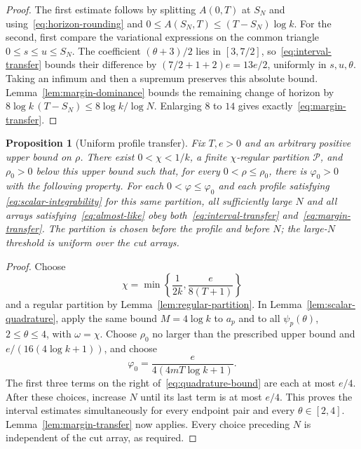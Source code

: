 \documentclass[11pt]{article}
\numberwithin{equation}{section}
\newtheorem{proposition}[theorem]{Proposition}
\theoremstyle{definition}
\theoremstyle{remark}
\newcommand{\1}{\mathbf 1}
\begin{document}
\begin{proof}
The first estimate follows by splitting $A(0,T)$ at $S_N$ and
using~\eqref{eq:horizon-rounding} and
$0\le A(S_N,T)\le(T-S_N)\log k$. For the second, first compare
the variational expressions on the common triangle
$0\le s\le u\le S_N$. The coefficient $(\theta+3)/2$ lies in
$[3,7/2]$, so~\eqref{eq:interval-transfer} bounds their difference
by $(7/2+1+2)e=13e/2$, uniformly in $s,u,\theta$. Taking an
infimum and then a supremum preserves this absolute bound.
Lemma~\ref{lem:margin-dominance} bounds the remaining change of
horizon by $8\log k\,(T-S_N)\le8\log k/\log N$. Enlarging $8$
to $14$ gives exactly~\eqref{eq:margin-transfer}.
\end{proof}

\begin{proposition}[Uniform profile transfer]%
\label{prop:profile-transfer}
Fix $T,e>0$ and an arbitrary positive upper bound on $\rho$.
There exist $0<\chi<1/k$, a finite $\chi$-regular partition
$\mathcal P$, and $\rho_0>0$ below this upper bound such that, for
every $0<\rho\le\rho_0$, there is $\varphi_0>0$ with the following
property. For each $0<\varphi\le\varphi_0$ and each profile satisfying
\eqref{eq:scalar-integrability} for this same partition, all
sufficiently large $N$ and all arrays satisfying~\eqref{eq:almost-like}
obey both~\eqref{eq:interval-transfer} and~\eqref{eq:margin-transfer}.
The partition is chosen before the profile and before $N$; the
large-$N$ threshold is uniform over the cut arrays.
\end{proposition}

\begin{proof}
Choose
\[
 \chi=\min\left\{\frac1{2k},\frac e{8(T+1)}\right\}
\]
and a regular partition by Lemma~\ref{lem:regular-partition}. In
Lemma~\ref{lem:scalar-quadrature}, apply the same bound $M=4\log k$
to $a_p$ and to all $\psi_p(\theta)$, $2\le\theta\le4$, with
$\omega=\chi$. Choose $\rho_0$ no larger than the prescribed upper
bound and $e/(16(4\log k+1))$, and choose
\[
 \varphi_0=\frac e{4(4mT\log k+1)}.
\]
The first three terms on the right of~\eqref{eq:quadrature-bound}
are each at most $e/4$. After these choices, increase $N$ until its
last term is at most $e/4$. This proves the interval estimates
simultaneously for every endpoint pair and every $\theta\in[2,4]$.
Lemma~\ref{lem:margin-transfer} now applies. Every choice preceding
$N$ is independent of the cut array, as required.
\end{proof}
\end{document}
